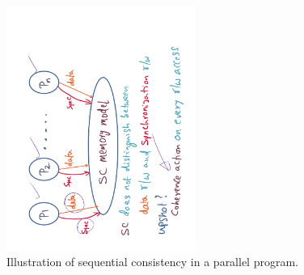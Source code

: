\documentclass[11pt]{lecture}
\def\fullsize{0.55\textwidth}
\begin{document}
\begin{figure}
\centering
\includegraphics[width=\fullsize,angle=-90]{Figures/upshot-sc}
\caption{Illustration of sequential consistency in a parallel program.}\label{fig: sc-upshot}
\end{figure}
\end{document}
